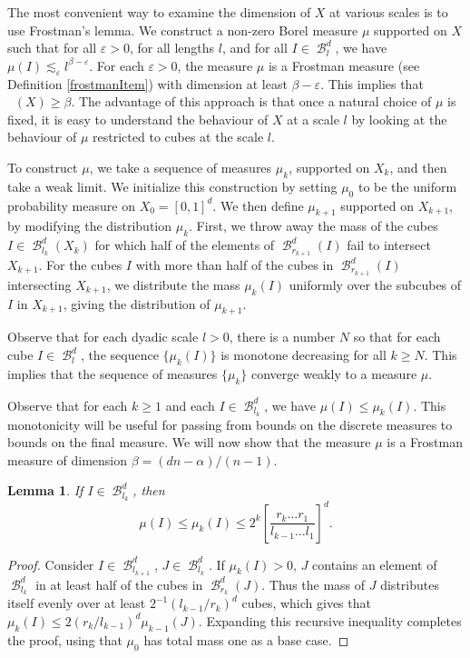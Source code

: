 \documentclass[dvipsnames,letterpaper,12pt]{article}
\numberwithin{equation}{section}
\theoremstyle{plain}
\newtheorem{lemma}{Lemma}
\DeclareMathOperator{\hausdim}{\dim_{\mathbf{H}}}
\DeclareMathOperator{\B}{\mathcal{B}}
\begin{document}
The most convenient way to examine the dimension of $X$ at various scales is to use Frostman's lemma. We construct a non-zero Borel measure $\mu$ supported on $X$ such that for all $\varepsilon > 0$, for all lengths $l$, and for all $I \in \B^d_l$, we have $\mu(I) \lesssim_\varepsilon l^{\beta - \varepsilon}$. For each $\varepsilon > 0$, the measure $\mu$ is a Frostman measure (see Definition \ref{frostmanItem}) with dimension at least $\beta - \varepsilon$. This implies that $\hausdim(X) \geq \beta$. The advantage of this approach is that once a natural choice of $\mu$ is fixed, it is easy to understand the behaviour of $X$ at a scale $l$ by looking at the behaviour of $\mu$ restricted to cubes at the scale $l$.

To construct $\mu$, we take a sequence of measures $\mu_k$, supported on $X_k$, and then take a weak limit. We initialize this construction by setting $\mu_0$ to be the uniform probability measure on $X_0 = [0,1]^d$. We then define $\mu_{k+1}$ supported on $X_{k+1}$, by modifying the distribution $\mu_k$. First, we throw away the mass of the cubes $I \in \B^d_{l_k}(X_k)$ for which half of the elements of $\B^d_{r_{k+1}}(I)$ fail to intersect $X_{k+1}$. For the cubes $I$ with more than half of the cubes in $\B^d_{r_{k+1}}(I)$ intersecting $X_{k+1}$, we distribute the mass $\mu_k(I)$ uniformly over the subcubes of $I$ in $X_{k+1}$, giving the distribution of $\mu_{k+1}$.

Observe that for each dyadic scale $l>0$, there is a number $N$ so that for each cube $I\in \B^d_l$, the sequence $\{\mu_k(I)\}$ is monotone decreasing for all $k\geq N$. This implies that the sequence of measures $\{\mu_k\}$ converge weakly to a measure $\mu$. 

Observe that for each $k\geq 1$ and each $I \in \B^d_{l_k}$, we have $\mu(I) \leq \mu_k(I)$. This monotonicity will be useful for passing from bounds on the discrete measures to bounds on the final measure. We will now show that the measure $\mu$ is a Frostman measure of dimension $\beta = (dn - \alpha)/(n-1)$.

\begin{lemma}
	If $I \in \B^d_{l_k}$, then
	\begin{equation} \label{mubound}
		\mu(I) \leq \mu_k(I) \leq 2^k \left[ \frac{r_k \dots r_1}{l_{k-1} \dots l_1} \right]^d.
	\end{equation}
\end{lemma}
\begin{proof}
	Consider $I \in \B^d_{l_{k+1}}$, $J \in \B^d_{l_k}$. If $\mu_k(I) > 0$, $J$ contains an element of $\B^d_{l_k}$ in at least half of the cubes in $\B^d_{r_k}(J)$. Thus the mass of $J$ distributes itself evenly over at least $2^{-1}(l_{k-1}/r_k)^d$ cubes, which gives that $\mu_k(I) \leq 2(r_k/l_{k-1})^d \mu_{k-1}(J)$. Expanding this recursive inequality completes the proof, using that $\mu_0$ has total mass one as a base case.
\end{proof}
\end{document}
